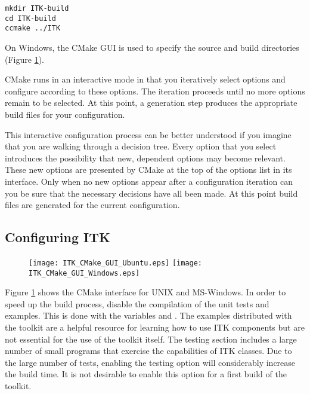 \small
\begin{verbatim}
mkdir ITK-build
cd ITK-build
ccmake ../ITK
\end{verbatim}
\normalsize

On Windows, the CMake GUI is used to specify the source and build
directories (Figure \ref{fig:CMakeGUI}).

CMake runs in an interactive mode in that you iteratively select options and
configure according to these options. The iteration proceeds until no more
options remain to be selected. At this point, a generation step produces the appropriate
build files for your configuration.

This interactive configuration process can be better understood if you
imagine that you are walking through a decision tree.  Every option that you
select introduces the possibility that new, dependent options may become
relevant. These new options are presented by CMake at the top of the options
list in its interface.  Only when no new options appear after a configuration
iteration can you be sure that the necessary decisions have all been made. At
this point build files are generated for the current configuration.

\subsection{Configuring ITK}
\label{sec:ConfiguringITKwithVTK}


\begin{figure}[ht]
\centering
\texttt{[image: ITK\_CMake\_GUI\_Ubuntu.eps]}
\texttt{[image: ITK\_CMake\_GUI\_Windows.eps]}
\label{fig:CMakeGUI}
\end{figure}

Figure \ref{fig:CMakeGUI} shows the CMake interface for UNIX and MS-Windows.
In order to speed up the build process, disable the compilation
of the unit tests and examples. This is done with the variables
 and .  The examples
distributed with the toolkit are a helpful resource for learning how to use ITK
components but are not essential for the use of the toolkit itself. The testing
section includes a large number of small programs that exercise the
capabilities of ITK classes. Due to the large number of tests, enabling the
testing option will considerably increase the build time.  It is not
desirable to enable this option for a first build of the toolkit.

